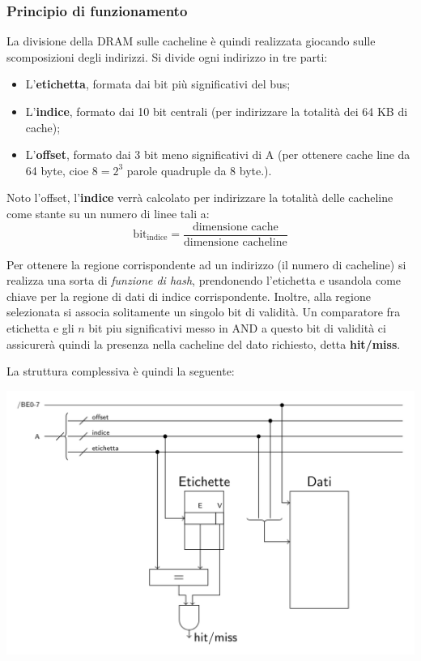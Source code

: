 \documentclass[a4paper,11pt]{article}
\begin{document}
\subsubsection{Principio di funzionamento}
La divisione della DRAM sulle cacheline è quindi realizzata giocando sulle scomposizioni degli indirizzi.
Si divide ogni indirizzo in tre parti:
\begin{itemize}
	\item L'\textbf{etichetta}, formata dai bit più significativi del bus;
	\item L'\textbf{indice}, formato dai 10 bit centrali (per indirizzare la totalità dei 64 KB di cache);
	\item L'\textbf{offset}, formato dai 3 bit meno significativi di A (per ottenere cache line da 64 byte, cioe $8 = 2^3$ parole quadruple da 8 byte.). 
\end{itemize}

Noto l'offset, l'\textbf{indice} verrà calcolato per indirizzare la totalità delle cacheline come stante su un numero di linee tali a:
$$
\mathrm{bit}_{\mathrm{indice}} = \frac{\text{dimensione cache}}{\text{dimensione cacheline}}
$$

Per ottenere la regione corrispondente ad un indirizzo (il numero di cacheline) si realizza una sorta di \textit{funzione di hash}, prendonendo l'etichetta e usandola come chiave per la regione di dati di indice corrispondente.
Inoltre, alla regione selezionata si associa solitamente un singolo bit di validità.
Un comparatore fra etichetta e gli $n$ bit piu significativi messo in AND a questo bit di validità ci assicurerà quindi la presenza nella cacheline del dato richiesto, detta \textbf{hit/miss}.

\noindent
\begin{minipage}{\textwidth}
La struttura complessiva è quindi la seguente:
\begin{center}
	\includegraphics[scale = 0.5]{../figures/cache_diretta.png}
\end{center}
\end{minipage}
\end{document}
